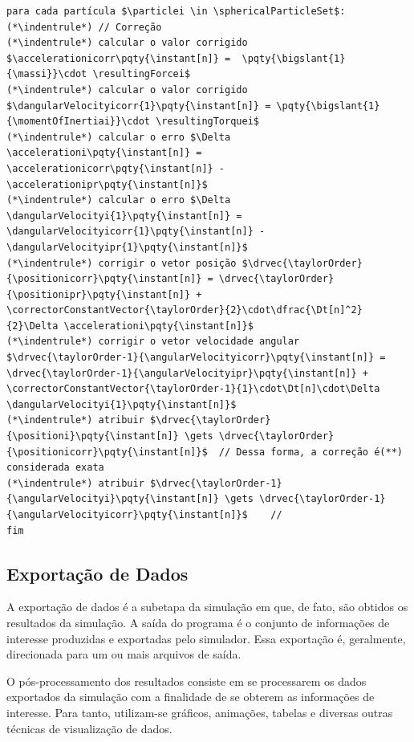 \begin{lstlisting}[float, floatplacement=h, language=pseudocode, label=lst:equations_solution, caption=Pseudocódigo para a solução das equações de movimento de partículas esféricas por meio do algoritmo de Gear.]
para cada partícula $\particlei \in \sphericalParticleSet$:
(*\indentrule*)	// Correção
(*\indentrule*)	calcular o valor corrigido $\accelerationicorr\pqty{\instant[n]} =  \pqty{\bigslant{1}{\massi}}\cdot \resultingForcei$
(*\indentrule*)	calcular o valor corrigido $\dangularVelocityicorr{1}\pqty{\instant[n]} = \pqty{\bigslant{1}{\momentOfInertiai}}\cdot \resultingTorquei$
(*\indentrule*)	calcular o erro $\Delta \accelerationi\pqty{\instant[n]} = \accelerationicorr\pqty{\instant[n]} - \accelerationipr\pqty{\instant[n]}$
(*\indentrule*)	calcular o erro $\Delta \dangularVelocityi{1}\pqty{\instant[n]} = \dangularVelocityicorr{1}\pqty{\instant[n]} - \dangularVelocityipr{1}\pqty{\instant[n]}$
(*\indentrule*)	corrigir o vetor posição $\drvec{\taylorOrder}{\positionicorr}\pqty{\instant[n]} = \drvec{\taylorOrder}{\positionipr}\pqty{\instant[n]} + \correctorConstantVector{\taylorOrder}{2}\cdot\dfrac{\Dt[n]^2}{2}\Delta \accelerationi\pqty{\instant[n]}$
(*\indentrule*)	corrigir o vetor velocidade angular $\drvec{\taylorOrder-1}{\angularVelocityicorr}\pqty{\instant[n]} = \drvec{\taylorOrder-1}{\angularVelocityipr}\pqty{\instant[n]} + \correctorConstantVector{\taylorOrder-1}{1}\cdot\Dt[n]\cdot\Delta \dangularVelocityi{1}\pqty{\instant[n]}$
(*\indentrule*)	atribuir $\drvec{\taylorOrder}{\positioni}\pqty{\instant[n]} \gets \drvec{\taylorOrder}{\positionicorr}\pqty{\instant[n]}$	// Dessa forma, a correção é(**) considerada exata
(*\indentrule*)	atribuir $\drvec{\taylorOrder-1}{\angularVelocityi}\pqty{\instant[n]} \gets \drvec{\taylorOrder-1}{\angularVelocityicorr}\pqty{\instant[n]}$	//		
fim
\end{lstlisting}

\subsection{Exportação de Dados}

A exportação de dados é a subetapa da simulação em que, de fato, são obtidos os resultados da simulação. A saída do programa é o conjunto de informações de interesse produzidas e exportadas pelo simulador. Essa exportação é, geralmente, direcionada para um ou mais arquivos de saída.

O pós-processamento dos resultados consiste em se processarem os dados exportados da simulação com a finalidade de se obterem as informações de interesse. Para tanto, utilizam-se gráficos, animações, tabelas e diversas outras técnicas de visualização de dados.

